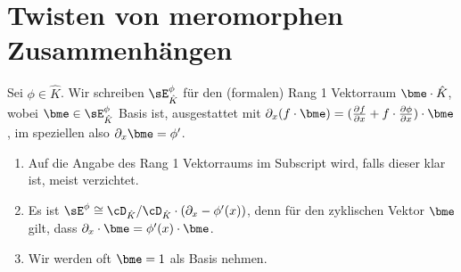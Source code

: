 \begin{comment}
\subsection{Betrachten bei Unendlich}
\end{comment}

\section{Twisten von meromorphen Zusammenhängen}
\begin{comment}
ALT:
\begin{defn}
\cite[1.a]{sabbah_Fourier-local}
Sei $\phi\in\hat K$.
Wir schreiben $\sE_{\hat K}^\phi$ für den (formalen) Rang 1 Vektorraum $\Cfxl
\bydef \hat K$ ausgestattet mit dem Zusammenhang
$\nabla=\partial_x+\partial_x\phi$, im speziellen also
$\nabla_{\partial_x}1=\partial_x1=\phi'$.\\
\end{defn}
\end{comment}
\begin{defn} \label{defn:rang1Vr}
\cite[1.a]{sabbah_Fourier-local}
Sei $\phi\in\hat K$.
Wir schreiben $\sE_{\hat K}^\phi$ für den (formalen) Rang 1 Vektorraum 
$\bme\cdot\hat K$, wobei $\bme\in\sE_{\hat K}^\phi$ Basis ist, ausgestattet mit
$\partial_x(f\cdot \bme)
=(\frac{\partial f}{\partial x}+f\cdot\frac{\partial\phi}{\partial
x})\cdot\bme$, 
im speziellen also $\partial_x\bme=\phi'$.
\end{defn}
\begin{bem}
\begin{enumerate}
\item Auf die Angabe des Rang 1 Vektorraums im Subscript wird, falls dieser
klar ist, meist verzichtet.
\item Es ist $\sE^\phi\cong\cD_{\hat K}/\cD_{\hat
K}\cdot(\partial_x-\phi'(x))$, denn für den zyklischen Vektor $\bme$ gilt, dass
$\partial_x \cdot \bme = \phi'(x) \cdot \bme$.
\item Wir werden oft $\bme=1$ als Basis nehmen.
\end{enumerate}
\end{bem}

